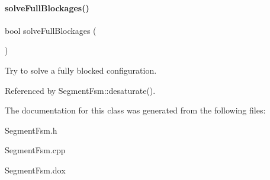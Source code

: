 \paragraph{\texorpdfstring{solve\+Full\+Blockages()}{solveFullBlockages()}}
{\footnotesize\ttfamily bool solve\+Full\+Blockages (\begin{DoxyParamCaption}{ }\end{DoxyParamCaption})}

Try to solve a fully blocked configuration. 

Referenced by Segment\+Fsm\+::desaturate().



The documentation for this class was generated from the following files\+:\begin{DoxyCompactItemize}
\item 
Segment\+Fsm.\+h\item 
Segment\+Fsm.\+cpp\item 
Segment\+Fsm.\+dox\end{DoxyCompactItemize}
